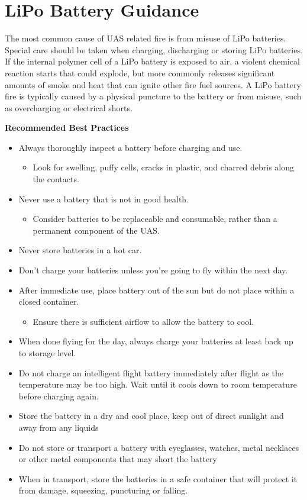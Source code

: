 \documentclass[
]{book}
\providecommand{\tightlist}{%
  \setlength{\itemsep}{0pt}\setlength{\parskip}{0pt}}
\begin{document}
\section{LiPo Battery Guidance}\label{lipo-battery-guidance}

The most common cause of UAS related fire is from misuse of LiPo batteries. Special care should be taken when charging, discharging or storing LiPo batteries. If the internal polymer cell of a LiPo battery is exposed to air, a violent chemical reaction starts that could explode, but more commonly releases significant amounts of smoke and heat that can ignite other fire fuel sources. A LiPo battery fire is typically caused by a physical puncture to the battery or from misuse, such as overcharging or electrical shorts.

\textbf{Recommended Best Practices}

\begin{itemize}
\item
  Always thoroughly inspect a battery before charging and use.

  \begin{itemize}
  \tightlist
  \item
    Look for swelling, puffy cells, cracks in plastic, and charred debris along the contacts.
  \end{itemize}
\item
  Never use a battery that is not in good health.

  \begin{itemize}
  \tightlist
  \item
    Consider batteries to be replaceable and consumable, rather than a permanent component of the UAS.
  \end{itemize}
\item
  Never store batteries in a hot car.
\item
  Don't charge your batteries unless you're going to fly within the next day.
\item
  After immediate use, place battery out of the sun but do not place within a closed container.

  \begin{itemize}
  \tightlist
  \item
    Ensure there is sufficient airflow to allow the battery to cool.
  \end{itemize}
\item
  When done flying for the day, always charge your batteries at least back up to storage level.
\item
  Do not charge an intelligent flight battery immediately after flight as the temperature may be too high. Wait until it cools down to room temperature before charging again.
\item
  Store the battery in a dry and cool place, keep out of direct sunlight and away from any liquids
\item
  Do not store or transport a battery with eyeglasses, watches, metal necklaces or other metal components that may short the battery
\item
  When in transport, store the batteries in a safe container that will protect it from damage, squeezing, puncturing or falling.
\end{itemize}
\end{document}
